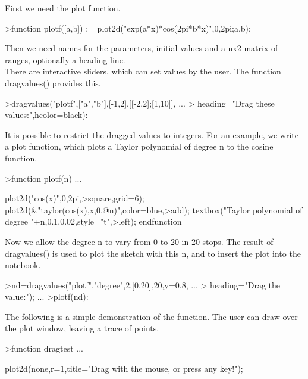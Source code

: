 \documentclass[a4paper,10pt]{article}
\begin{document}
\begin{eulernotebook}
\begin{eulercomment}
\begin{eulercomment}
\begin{eulercomment}
\begin{eulercomment}
\begin{eulercomment}
First we need the plot function.
\end{eulercomment}
\begin{eulerprompt}
>function plotf([a,b]) := plot2d("exp(a*x)*cos(2pi*b*x)",0,2pi;a,b);
\end{eulerprompt}
\begin{eulercomment}
Then we need names for the parameters, initial values and a nx2 matrix of ranges,
optionally a heading line.\\
There are interactive sliders, which can set values by the user. The function
dragvalues() provides this.
\end{eulercomment}
\begin{eulerprompt}
>dragvalues("plotf",["a","b"],[-1,2],[[-2,2];[1,10]], ...
>  heading="Drag these values:",hcolor=black):
\end{eulerprompt}
\begin{eulercomment}
It is possible to restrict the dragged values to integers. For an example, we write a
plot function, which plots a Taylor polynomial of degree n to the cosine function.
\end{eulercomment}
\begin{eulerprompt}
>function plotf(n) ...
\end{eulerprompt}
\begin{eulerudf}
  plot2d("cos(x)",0,2pi,>square,grid=6);
  plot2d(&"taylor(cos(x),x,0,@n)",color=blue,>add);
  textbox("Taylor polynomial of degree "+n,0.1,0.02,style="t",>left);
  endfunction
\end{eulerudf}
\begin{eulercomment}
Now we allow the degree n to vary from 0 to 20 in 20 stops. The result of dragvalues()
is used to plot the sketch with this n, and to insert the plot into the notebook.
\end{eulercomment}
\begin{eulerprompt}
>nd=dragvalues("plotf","degree",2,[0,20],20,y=0.8, ...
>   heading="Drag the value:"); ...
>plotf(nd):
\end{eulerprompt}
\begin{eulercomment}
The following is a simple demonstration of the function. The user can draw over the plot
window, leaving a trace of points.
\end{eulercomment}
\begin{eulerprompt}
>function dragtest ...
\end{eulerprompt}
\begin{eulerudf}
    plot2d(none,r=1,title="Drag with the mouse, or press any key!");

\end{eulerudf}
\end{eulercomment}
\end{eulercomment}
\end{eulercomment}
\end{eulercomment}
\end{eulernotebook}
\end{document}
